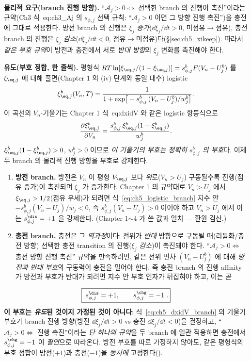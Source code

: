 \textbf{물리적 요구(branch 진행 방향).} ``$\mathcal A_j>0\Leftrightarrow$ 선택한 branch 의 진행이 촉진''이라는
규약(Ch3 식~eq:ch3\_Aj 의 $s_{\phi,j}$ 선택 규칙: ``$\mathcal A_j>0$ 이면 그 방향 진행 촉진'')을 충전에 그대로
적용한다. 방전 branch 의 진행은 $\xi_j$ \emph{증가}($\dd\xi_j/\dd t>0$, 미점유$\to$점유), 충전 branch 의 진행은
$\xi_j$ \emph{감소}($\dd\xi_j/\dd t<0$, 점유$\to$미점유)다(\S\ref{sec:ch5_xikeep}). 따라서 \emph{같은 부호 규약}이
방전과 충전에서 서로 \emph{반대 방향}의 $\xi_j$ 변화를 촉진해야 한다.

\textbf{유도(부호 정합, 한 줄씩).} 평형식 $RT\ln[\xi_{\eq,j}/(1-\xi_{\eq,j})]=s_{\phi,j}^b F(V_n-U_j^b)$ 를
$\xi_{\eq,j}$ 에 대해 풀면(Chapter 1 의 (iv) 단계와 동일 대수) logistic
\begin{equation}
\xi_{\eq,j}^b(V_n,T)=\frac{1}{1+\exp\!\big[-s_{\phi,j}^b\,(V_n-U_j^b)/w_j^b\big]}.
\label{eq:ch5_logistic_branch}
\end{equation}
이 곡선의 $V_n$-기울기는 Chapter 1 식~eq:dxidV 와 같은 logistic 항등식으로
\begin{equation}
\frac{\partial\xi_{\eq,j}^b}{\partial V_n}=\frac{s_{\phi,j}^b\,\xi_{\eq,j}^b(1-\xi_{\eq,j}^b)}{w_j^b}.
\label{eq:ch5_dxidV_branch}
\end{equation}
$\xi_{\eq,j}^b(1-\xi_{\eq,j}^b)>0$, $w_j^b>0$ 이므로 \emph{이 기울기의 부호는 정확히 $s_{\phi,j}^b$ 의 부호}다.
이제 두 branch 의 물리적 진행 방향을 부호로 강제한다.
\begin{enumerate}[label=(\roman*),leftmargin=2.2em]
\item \textbf{방전 branch.} 방전은 $V_n$ 이 평형 $V_{\eq,j}$ 보다 \emph{위}로($V_n>U_j$) 구동될수록 진행(점유
  증가)이 촉진되며 $\xi_j$ 가 증가한다. Chapter 1 의 규약대로 $V_n>U_j$ 에서 $\xi_{\eq,j}>1/2$(점유 우세)가 되려면
  식~\eqref{eq:ch5_logistic_branch} 지수 안 $-s_{\phi,j}^b(V_n-U_j)/w_j<0$, 즉 $s_{\phi,j}^b(V_n-U_j)>0$ 이어야
  하고 $V_n>U_j$ 에서 이는 $s_{\phi,j}^\dis=+1$ 을 강제한다. (Chapter 1$\sim$4 가 쓴 값과 일치 — 환원 검산.)
\item \textbf{충전 branch.} 충전은 그 \emph{역과정}이다: 전위가 \emph{반대} 방향으로 구동될 때(리튬화/충전
  방향) 선택한 충전 transition 의 진행($\xi_j$ \emph{감소})이 촉진돼야 한다. ``$\mathcal A_j>0\Leftrightarrow$
  충전 방향 진행 촉진'' 규약을 만족하려면, 같은 전위 편차 $(V_n-U_j^b)$ 에 대해 \emph{방전과 반대 부호}의
  구동력이 충전을 밀어야 한다. 즉 충전 branch 의 진행 affinity 가 방전과 부호가 반대가 되려면 지수 안 부호
  인자가 뒤집혀야 하고, 이는 곧
\end{enumerate}
\begin{equation}
\boxed{\;s_{\phi,j}^\dis=+1,\qquad s_{\phi,j}^\chg=-1\;.}
\label{eq:ch5_schg}
\end{equation}
\textbf{이 부호는 \emph{유도}된 것이지 가정된 것이 아니다}: 식~\eqref{eq:ch5_dxidV_branch} 의 기울기 부호가
branch 진행 방향(방전 $\dd\xi_j/\dd t>0$ vs 충전 $\dd\xi_j/\dd t<0$)을 결정하고, ``$\mathcal A_j>0\Leftrightarrow$
진행 촉진''이라는 \emph{단 하나의 규약}을 두 branch 에 일관 적용하면 충전에서 $s_{\phi,j}^\chg=-1$ 이
\emph{필연}으로 따라온다. 방전 부호를 따로 가정하지 않아도, 같은 평형식의 부호 정합이 방전($+1$)과 충전($-1$)을
\emph{동시에} 고정한다().

